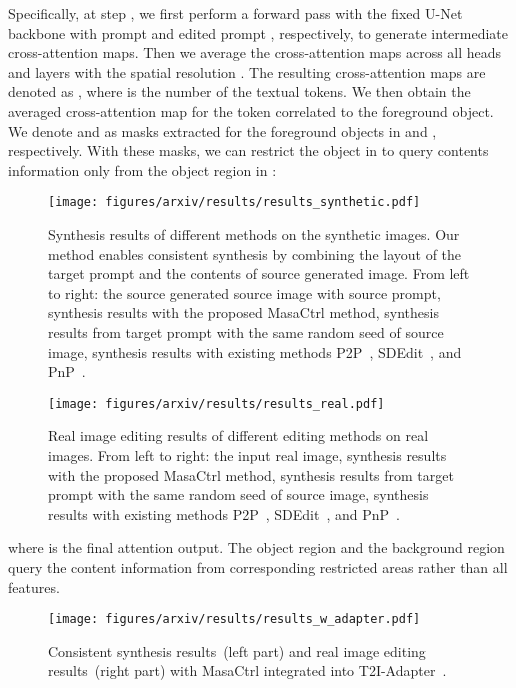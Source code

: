 \documentclass[10pt,twocolumn,letterpaper]{article}
\begin{document}
Specifically, at step , we first perform a forward pass with the fixed U-Net backbone with prompt  and edited prompt , respectively, to generate intermediate cross-attention maps.
Then we average the cross-attention maps across all heads and layers with the spatial resolution . The resulting cross-attention maps are denoted as , where  is the number of the textual tokens. 
We then obtain the averaged cross-attention map for the token correlated to the foreground object. We denote  and  as masks extracted for the foreground objects in  and , respectively. With these masks, we can restrict the object in  to query contents information only from the object region in :

\begin{figure*}[!t]
    \centering
    \texttt{[image: figures/arxiv/results/results\_synthetic.pdf]}
    \caption{Synthesis results of different methods on the synthetic images. Our method enables consistent synthesis by combining the layout of the target prompt and the contents of source generated image. From left to right: the source generated source image with source prompt, synthesis results with the proposed MasaCtrl method, synthesis results from target prompt with the same random seed of source image, synthesis results with existing methods    P2P~\cite{hertz2022prompt}, SDEdit~\cite{meng2021sdedit}, and PnP~\cite{tumanyan2022plug}. }
    \label{fig:results_synthetic}
\end{figure*}

\begin{figure*}[!t]
    \centering
    \texttt{[image: figures/arxiv/results/results\_real.pdf]}
    \caption{Real image editing results of different editing methods on real images. From left to right: the input real image, synthesis results with the proposed MasaCtrl method, synthesis results from target prompt with the same random seed of source image, synthesis results with existing methods    P2P~\cite{hertz2022prompt}, SDEdit~\cite{meng2021sdedit}, and PnP~\cite{tumanyan2022plug}. }
    \label{fig:results_real}
\end{figure*}



where  is the final attention output.
The object region and the background region query the content information from corresponding restricted areas rather than all features.

\begin{figure*}
    \centering
    \texttt{[image: figures/arxiv/results/results\_w\_adapter.pdf]}
    \caption{Consistent synthesis results~(left part) and real image editing results~(right part) with MasaCtrl integrated into T2I-Adapter~\cite{mou2023t2i}. }
    \label{fig:results_adapter}
\end{figure*}
\end{document}
